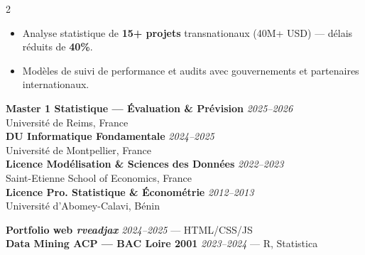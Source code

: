 \documentclass[9pt,a4paper,ragged2e,withhyper]{altacv}
\begin{document}
\begin{paracol}{2}
\vspace{-2pt}\divider\vspace{-2pt}

\vspace{-4pt}
\begin{itemize}
  \item Analyse statistique de \textbf{15+ projets} transnationaux (40M+ USD) --- délais réduits de \textbf{40\%}.
  \item Modèles de suivi de performance et audits avec gouvernements et partenaires internationaux.
\end{itemize}


\vspace{-2pt}
{\scriptsize
\textbf{\color{accent}Master 1 Statistique --- Évaluation \& Prévision} \hfill \textit{2025--2026}\\
\color{body}Université de Reims, France\\[2pt]
\textbf{\color{accent}DU Informatique Fondamentale} \hfill \textit{2024--2025}\\
\color{body}Université de Montpellier, France\\[2pt]
\textbf{\color{accent}Licence Modélisation \& Sciences des Données} \hfill \textit{2022--2023}\\
\color{body}Saint-Etienne School of Economics, France\\[2pt]
\textbf{\color{accent}Licence Pro. Statistique \& Économétrie} \hfill \textit{2012--2013}\\
\color{body}Université d'Abomey-Calavi, Bénin
}

{\scriptsize
\textbf{\color{accent}Portfolio web \emph{rveadjax}} \hfill \textit{2024--2025} --- HTML/CSS/JS\\[2pt]
\textbf{\color{accent}Data Mining ACP --- BAC Loire 2001} \hfill \textit{2023--2024} --- R, Statistica
}

\switchcolumn




\vspace{2pt}
\\[2pt]
\\[2pt]


\end{paracol}
\end{document}
